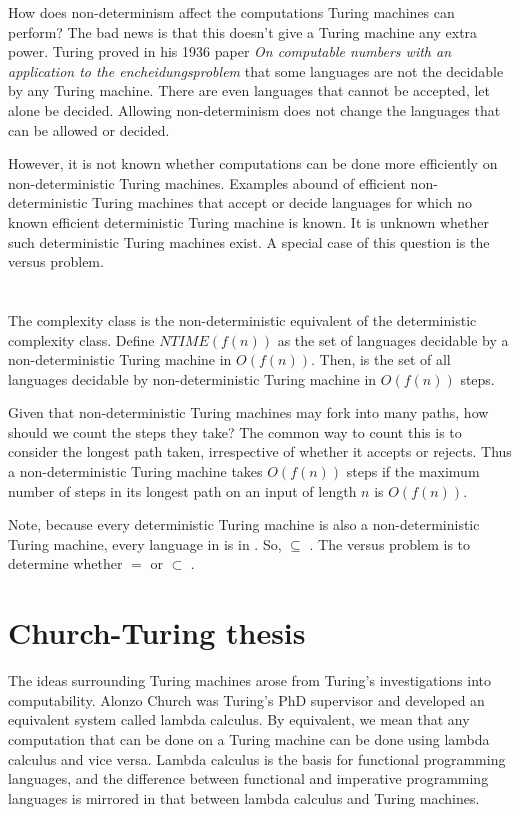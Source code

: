 \documentclass{iansnotes}
\begin{document}
  How does non-determinism affect the computations Turing machines can perform?
  The bad news is that this doesn't give a Turing machine any extra power.
  Turing proved in his 1936 paper \emph{On computable numbers with an application to the encheidungsproblem} that some languages are not the decidable by any Turing machine.
  There are even languages that cannot be accepted, let alone be decided.
  Allowing non-determinism does not change the languages that can be allowed or decided.

  However, it is not known whether computations can be done more efficiently on non-deterministic Turing machines.
  Examples abound of efficient non-deterministic Turing machines that accept or decide languages for which no known efficient deterministic Turing machine is known.
  It is unknown whether such deterministic Turing machines exist.
  A special case of this question is the  versus  problem.


\section{}
  The  complexity class is the non-deterministic equivalent of the deterministic  complexity class.
  Define \( NTIME(f(n)) \) as the set of languages decidable by a non-deterministic Turing machine in \( O(f(n)) \).
  Then,  is the set of all languages decidable by non-deterministic Turing machine in \( O(f(n)) \) steps.

  Given that non-deterministic Turing machines may fork into many paths, how should we count the steps they take?
  The common way to count this is to consider the longest path taken, irrespective of whether it accepts or rejects.
  Thus a non-deterministic Turing machine takes \(O(f(n))\) steps if the maximum number of steps in its longest path on an input of length \(n\) is \(O(f(n))\).

  Note, because every deterministic Turing machine is also a non-deterministic Turing machine, every language in  is in .
  So,  \( \subseteq \) .
  The  versus  problem is to determine whether  \( = \)  or  \( \subset \) .

\section{Church-Turing thesis}
  The ideas surrounding Turing machines arose from Turing's investigations into computability.
  Alonzo Church was Turing's PhD supervisor and developed an equivalent system called lambda calculus.
  By equivalent, we mean that any computation that can be done on a Turing machine can be done using lambda calculus and vice versa.
  Lambda calculus is the basis for functional programming languages, and the difference between functional and imperative programming languages is mirrored in that between lambda calculus and Turing machines.
  
\end{document}
